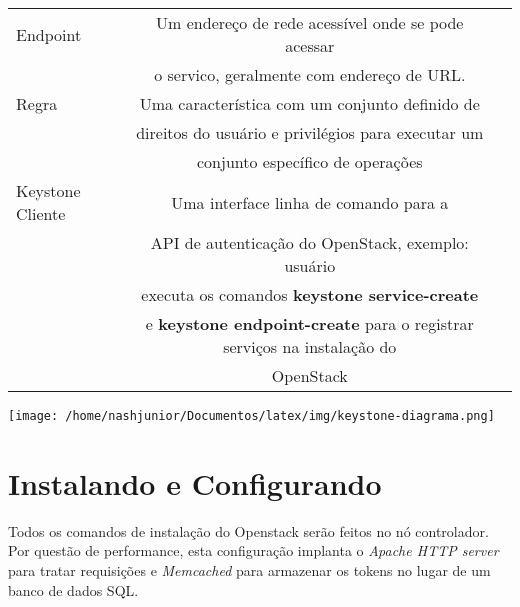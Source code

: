 \begin{tabular}{|l||c|c|}
	\hline \hline
	
	Endpoint& Um endereço de rede acessível onde se pode acessar\\& o servico, geralmente com endereço de URL. \\
	
	\hline \hline
	
	Regra& Uma característica com um conjunto definido de \\&direitos do usuário e privilégios para executar um\\& conjunto específico de operações \\
	
	\hline \hline
	Keystone Cliente& Uma interface linha de comando para a\\& API de autenticação do OpenStack, exemplo: usuário\\& executa os comandos \textbf{keystone service-create}\\& e \textbf{keystone endpoint-create} para o registrar serviços na instalação do \\&OpenStack
	\end{tabular}
	
	\begin{center}
			\texttt{[image: /home/nashjunior/Documentos/latex/img/keystone-diagrama.png]}
	\end{center}

\section{Instalando e Configurando}
	Todos os comandos de instalação do Openstack serão feitos no nó controlador. Por questão de performance, esta configuração implanta o \emph{Apache HTTP server} para tratar requisições e \emph{Memcached} para armazenar os tokens no lugar de um banco de dados SQL.
	
